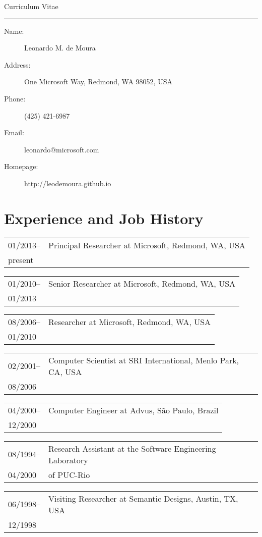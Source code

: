 \documentclass{article}
\newcommand{\job}[4]{\begin{flushleft}
                                        \begin{tabular}{ll}
                                         #1-- & #3 \\
                     #2 & #4 \\
                    \end{tabular}
                                        \end{flushleft}
                    }
\newcommand{\myhp}{http://leodemoura.github.io}
\begin{document}
{
\begin{flushleft}
{\Huge{Curriculum Vitae}} \\
\hspace{.1in}
\hrule
\end{flushleft}
}




\begin{description}
\item [Name:] Leonardo M. de Moura
\item [Address:] One Microsoft Way, Redmond, WA 98052, USA
\item [Phone:] (425) 421-6987
\item [Email:] leonardo@microsoft.com
\item [Homepage:] \myhp
\end{description}

\section*{Experience and Job History}

\job{01/2013}{present}{Principal Researcher at Microsoft, Redmond, WA, USA}{}

\job{01/2010}{01/2013}{Senior Researcher at Microsoft, Redmond, WA, USA}{}

\job{08/2006}{01/2010}{Researcher at Microsoft, Redmond, WA, USA}{}

\job{02/2001}{08/2006}{Computer Scientist at SRI International, Menlo Park, CA, USA}{}

\job{04/2000}{12/2000}{Computer Engineer at Advus, S\~{a}o Paulo, Brazil}{}

\job{08/1994}{04/2000}{Research Assistant at the Software Engineering Laboratory}{of PUC-Rio}

\job{06/1998}{12/1998}{Visiting Researcher at Semantic Designs, Austin, TX, USA}{}
\end{document}
